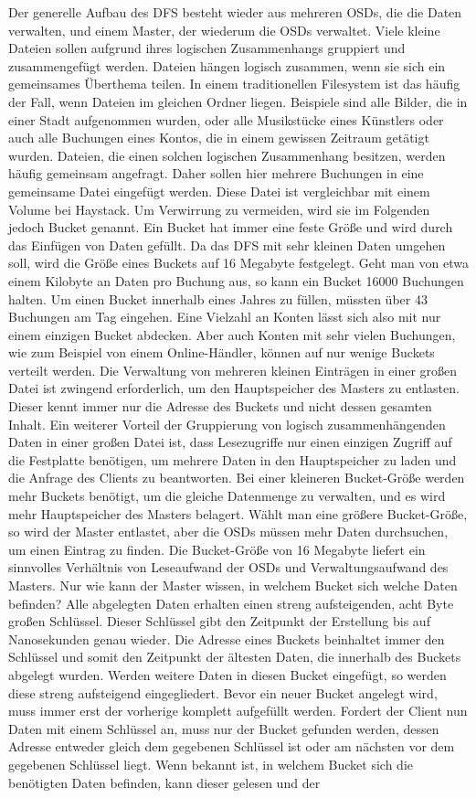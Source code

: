 \documentclass[12pt,oneside,a4paper,parskip]{scrbook}
\begin{document}
Der generelle Aufbau des DFS besteht wieder aus mehreren OSDs, die die Daten verwalten, und einem Master, der wiederum die OSDs verwaltet. Viele kleine Dateien sollen aufgrund ihres logischen Zusammenhangs gruppiert und zusammengefügt werden. Dateien hängen logisch zusammen, wenn sie sich ein gemeinsames Überthema teilen. In einem traditionellen Filesystem ist das häufig der Fall, wenn Dateien im gleichen Ordner liegen. Beispiele sind alle Bilder, die in einer Stadt aufgenommen wurden, oder alle Musikstücke eines Künstlers oder auch alle Buchungen eines Kontos, die in einem gewissen Zeitraum getätigt wurden. Dateien, die einen solchen logischen Zusammenhang besitzen, werden häufig gemeinsam angefragt. Daher sollen hier mehrere Buchungen in eine gemeinsame Datei eingefügt werden. Diese Datei ist vergleichbar mit einem Volume bei Haystack. Um Verwirrung zu vermeiden, wird sie im Folgenden jedoch Bucket genannt. Ein Bucket hat immer eine feste Größe und wird durch das Einfügen von Daten gefüllt. Da das DFS mit sehr kleinen Daten umgehen soll, wird die Größe eines Buckets auf 16 Megabyte festgelegt. Geht man von etwa einem Kilobyte an Daten pro Buchung aus, so kann ein Bucket 16000 Buchungen halten. Um einen Bucket innerhalb eines Jahres zu füllen, müssten über 43 Buchungen am Tag eingehen. Eine Vielzahl an Konten lässt sich also mit nur einem einzigen Bucket abdecken. Aber auch Konten mit sehr vielen Buchungen, wie zum Beispiel von einem Online-Händler, können auf nur wenige Buckets verteilt werden. Die Verwaltung von mehreren kleinen Einträgen in einer großen Datei ist zwingend erforderlich, um den Hauptspeicher des Masters zu entlasten. Dieser kennt immer nur die Adresse des Buckets und nicht dessen gesamten Inhalt. Ein weiterer Vorteil der Gruppierung von logisch zusammenhängenden Daten in einer großen Datei ist, dass Lesezugriffe nur einen einzigen Zugriff auf die Festplatte benötigen, um mehrere Daten in den Hauptspeicher zu laden und die Anfrage des Clients zu beantworten. Bei einer kleineren Bucket-Größe werden mehr Buckets benötigt, um die gleiche Datenmenge zu verwalten, und es wird mehr Hauptspeicher des Masters belagert. Wählt man eine größere Bucket-Größe, so wird der Master entlastet, aber die OSDs müssen mehr Daten durchsuchen, um einen Eintrag zu finden. Die Bucket-Größe von 16 Megabyte liefert ein sinnvolles Verhältnis von Leseaufwand der OSDs und Verwaltungsaufwand des Masters. Nur wie kann der Master wissen, in welchem Bucket sich welche Daten befinden? Alle abgelegten Daten erhalten einen streng aufsteigenden, acht Byte großen Schlüssel. Dieser Schlüssel gibt den Zeitpunkt der Erstellung bis auf Nanosekunden genau wieder. Die Adresse eines Buckets beinhaltet immer den Schlüssel und somit den Zeitpunkt der ältesten Daten, die innerhalb des Buckets abgelegt wurden. Werden weitere Daten in diesen Bucket eingefügt, so werden diese streng aufsteigend eingegliedert. Bevor ein neuer Bucket angelegt wird, muss immer erst der vorherige komplett aufgefüllt werden. Fordert der Client nun Daten mit einem Schlüssel an, muss nur der Bucket gefunden werden, dessen Adresse entweder gleich dem gegebenen Schlüssel ist oder am nächsten vor dem gegebenen Schlüssel liegt. Wenn bekannt ist, in welchem Bucket sich die benötigten Daten befinden, kann dieser gelesen und der 
\end{document}
